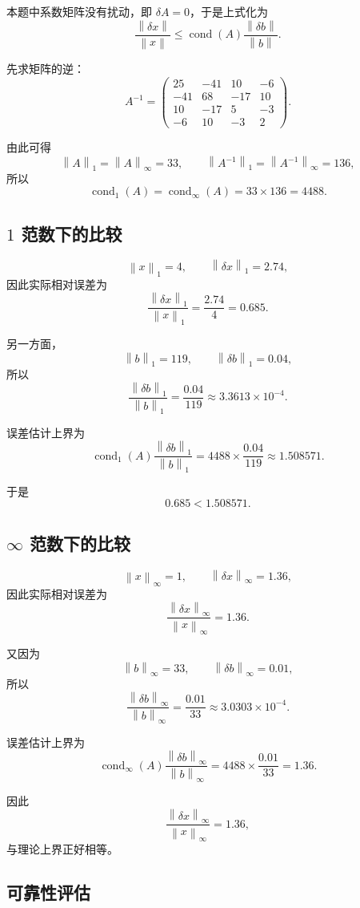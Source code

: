 \documentclass[12pt,a4paper]{ctexart}
\newcommand{\norm}[1]{\left\lVert #1 \right\rVert}
\begin{document}
本题中系数矩阵没有扰动，即 $\delta A=0$，于是上式化为
\[
\frac{\norm{\delta x}}{\norm{x}}
\le
\operatorname{cond}(A)\frac{\norm{\delta b}}{\norm{b}}.
\]

先求矩阵的逆：
\[
A^{-1}=
\begin{pmatrix}
25&-41&10&-6\\
-41&68&-17&10\\
10&-17&5&-3\\
-6&10&-3&2
\end{pmatrix}.
\]

由此可得
\[
\norm{A}_1=\norm{A}_{\infty}=33,\qquad
\norm{A^{-1}}_1=\norm{A^{-1}}_{\infty}=136,
\]
所以
\[
\operatorname{cond}_1(A)=\operatorname{cond}_{\infty}(A)=33\times136=4488.
\]

\subsection{$1$ 范数下的比较}

\[
\norm{x}_1=4,\qquad
\norm{\delta x}_1=2.74,
\]
因此实际相对误差为
\[
\frac{\norm{\delta x}_1}{\norm{x}_1}=\frac{2.74}{4}=0.685.
\]

另一方面，
\[
\norm{b}_1=119,\qquad
\norm{\delta b}_1=0.04,
\]
所以
\[
\frac{\norm{\delta b}_1}{\norm{b}_1}=\frac{0.04}{119}\approx 3.3613\times 10^{-4}.
\]

误差估计上界为
\[
\operatorname{cond}_1(A)\frac{\norm{\delta b}_1}{\norm{b}_1}
=4488\times\frac{0.04}{119}
\approx 1.508571.
\]

于是
\[
0.685<1.508571.
\]

\subsection{$\infty$ 范数下的比较}

\[
\norm{x}_{\infty}=1,\qquad
\norm{\delta x}_{\infty}=1.36,
\]
因此实际相对误差为
\[
\frac{\norm{\delta x}_{\infty}}{\norm{x}_{\infty}}=1.36.
\]

又因为
\[
\norm{b}_{\infty}=33,\qquad
\norm{\delta b}_{\infty}=0.01,
\]
所以
\[
\frac{\norm{\delta b}_{\infty}}{\norm{b}_{\infty}}=\frac{0.01}{33}\approx 3.0303\times 10^{-4}.
\]

误差估计上界为
\[
\operatorname{cond}_{\infty}(A)\frac{\norm{\delta b}_{\infty}}{\norm{b}_{\infty}}
=4488\times\frac{0.01}{33}=1.36.
\]

因此
\[
\frac{\norm{\delta x}_{\infty}}{\norm{x}_{\infty}}=1.36,
\]
与理论上界正好相等。

\subsection{可靠性评估}
\end{document}
